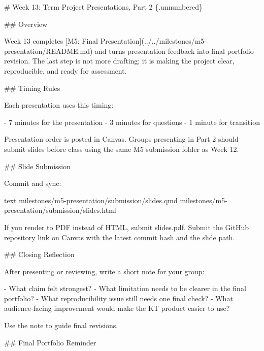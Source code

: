\documentclass[
  letterpaper,
  DIV=11,
  numbers=noendperiod,
  oneside]{scrreprt}
\newenvironment{Shaded}{\begin{snugshade}}{\end{snugshade}}
\newcommand{\CommentTok}[1]{\textcolor[rgb]{0.37,0.37,0.37}{#1}}
\newcommand{\FunctionTok}[1]{\textcolor[rgb]{0.28,0.35,0.67}{#1}}
\newcommand{\InformationTok}[1]{\textcolor[rgb]{0.37,0.37,0.37}{#1}}
\newcommand{\NormalTok}[1]{\textcolor[rgb]{0.00,0.23,0.31}{#1}}
\newcommand{\OtherTok}[1]{\textcolor[rgb]{0.00,0.23,0.31}{#1}}
\newcommand{\SpecialStringTok}[1]{\textcolor[rgb]{0.13,0.47,0.30}{#1}}
\begin{document}
\begin{Shaded}
\begin{Highlighting}[numbers=left,,]
\FunctionTok{\# Week 13: Term Project Presentations, Part 2 \{.unnumbered\}}


\FunctionTok{\#\# Overview}

\NormalTok{Week 13 completes }\CommentTok{[}\OtherTok{M5: Final Presentation}\CommentTok{](../../milestones/m5{-}presentation/README.md)}\NormalTok{ and turns presentation feedback into final portfolio revision. The last step is not more drafting; it is making the project clear, reproducible, and ready for assessment.}

\FunctionTok{\#\# Timing Rules}

\NormalTok{Each presentation uses this timing:}

\SpecialStringTok{{-} }\NormalTok{7 minutes for the presentation}
\SpecialStringTok{{-} }\NormalTok{3 minutes for questions}
\SpecialStringTok{{-} }\NormalTok{1 minute for transition}

\NormalTok{Presentation order is posted in Canvas. Groups presenting in Part 2 should submit slides before class using the same M5 submission folder as Week 12.}

\FunctionTok{\#\# Slide Submission}

\NormalTok{Commit and sync:}

\InformationTok{\textasciigrave{}\textasciigrave{}\textasciigrave{}text}
\InformationTok{milestones/m5{-}presentation/submission/slides.qmd}
\InformationTok{milestones/m5{-}presentation/submission/slides.html}
\InformationTok{\textasciigrave{}\textasciigrave{}\textasciigrave{}}

\NormalTok{If you render to PDF instead of HTML, submit }\InformationTok{\textasciigrave{}slides.pdf\textasciigrave{}}\NormalTok{. Submit the GitHub repository link on Canvas with the latest commit hash and the slide path.}

\FunctionTok{\#\# Closing Reflection}

\NormalTok{After presenting or reviewing, write a short note for your group:}

\SpecialStringTok{{-} }\NormalTok{What claim felt strongest?}
\SpecialStringTok{{-} }\NormalTok{What limitation needs to be clearer in the final portfolio?}
\SpecialStringTok{{-} }\NormalTok{What reproducibility issue still needs one final check?}
\SpecialStringTok{{-} }\NormalTok{What audience{-}facing improvement would make the KT product easier to use?}

\NormalTok{Use the note to guide final revisions.}

\FunctionTok{\#\# Final Portfolio Reminder}


\end{Highlighting}
\end{Shaded}
\end{document}
